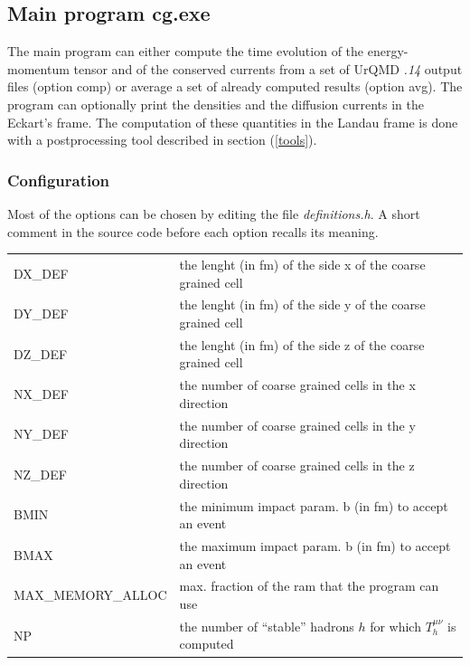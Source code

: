 \documentclass[12pt, a4paper]{article}
\begin{document}
\subsection{Main program cg.exe}\label{main}
The main program can either compute the time evolution of the energy-momentum tensor and of the conserved currents from a set of UrQMD \emph{.14} output files (option comp) or average a set of already computed results (option avg). The program can optionally print the densities and the diffusion currents in the Eckart's frame. The computation of these quantities in the Landau frame is done with a postprocessing tool described in section (\ref{tools}).\\
\subsubsection{Configuration}
Most of the options can be chosen by editing the file \emph{definitions.h}. A short comment in the source code before each option recalls its meaning.
\begin{footnotesize}
\begin{center}
	\begin{tabular}{ l l }
		\textcolor{PineGreen}{DX\_DEF } &  the lenght (in fm) of the side x of the coarse grained cell\\ 
		\textcolor{PineGreen}{DY\_DEF } &  the lenght (in fm) of the side y of the coarse grained cell\\
		\textcolor{PineGreen}{DZ\_DEF } &  the lenght (in fm) of the side z of the coarse grained cell\\
		\textcolor{PineGreen}{NX\_DEF}  &  the number of coarse grained cells in the x direction\\
		\textcolor{PineGreen}{NY\_DEF}  &  the number of coarse grained cells in the y direction\\
		\textcolor{PineGreen}{NZ\_DEF}  &  the number of coarse grained cells in the z direction\\
		\textcolor{PineGreen}{BMIN}     &  the minimum impact param. b (in fm) to accept an event\\
	    \textcolor{PineGreen}{BMAX}     &  the maximum impact param. b (in fm) to accept an event\\
	    \textcolor{PineGreen}{MAX\_MEMORY\_ALLOC} & max. fraction of the ram that the program can use\\
	    \textcolor{PineGreen}{NP} & the number of ``stable'' hadrons $h$ for which $T_h^{\mu\nu}$ is computed
	 \end{tabular}
\end{center}
\end{footnotesize}
\end{document}
